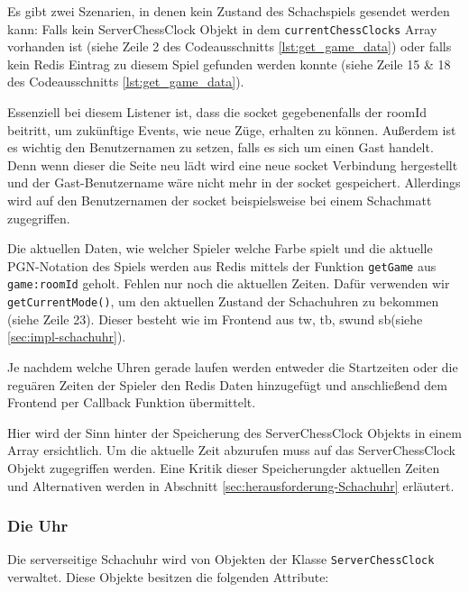 Es gibt zwei Szenarien, in denen kein Zustand des Schachspiels gesendet werden kann: Falls kein ServerChessClock Objekt in dem \verb|currentChessClocks| Array vorhanden ist (siehe Zeile 2 des Codeausschnitts \ref{lst:get_game_data}) oder falls kein Redis Eintrag zu diesem Spiel gefunden werden konnte (siehe Zeile 15 \& 18 des Codeausschnitts \ref{lst:get_game_data}).

Essenziell bei diesem Listener ist, dass die socket gegebenenfalls der roomId beitritt, um zukünftige Events, wie neue Züge, erhalten zu können. Außerdem ist es wichtig den Benutzernamen zu setzen, falls es sich um einen Gast handelt. Denn wenn dieser die Seite neu lädt wird eine neue socket Verbindung hergestellt und der Gast-Benutzername wäre nicht mehr in der socket gespeichert. Allerdings wird auf den Benutzernamen der socket beispielsweise bei einem Schachmatt zugegriffen.

Die aktuellen Daten, wie welcher Spieler welche Farbe spielt und die aktuelle PGN-Notation des Spiels werden aus Redis mittels der Funktion \verb|getGame| aus \verb|game:roomId| geholt. Fehlen nur noch die aktuellen Zeiten. Dafür verwenden wir \verb|getCurrentMode()|, um den aktuellen Zustand der Schachuhren zu bekommen (siehe Zeile 23). Dieser besteht wie im Frontend aus \glqq tw\grqq , \glqq tb\grqq , \glqq sw\grqq{ }und \glqq sb\grqq{ }(siehe \ref{sec:impl-schachuhr}). 

Je nachdem welche Uhren gerade laufen werden entweder die Startzeiten oder die reguären Zeiten der Spieler den Redis Daten hinzugefügt und anschließend dem Frontend per Callback Funktion übermittelt.

Hier wird der Sinn hinter der Speicherung des ServerChessClock Objekts in einem Array ersichtlich. Um die aktuelle Zeit abzurufen muss auf das ServerChessClock Objekt zugegriffen werden. Eine Kritik dieser Speicherungder aktuellen Zeiten und Alternativen werden in Abschnitt \ref{sec:herausforderung-Schachuhr} erläutert.

\subsubsection{Die Uhr}
\label{sec:Uhr-Backend-impl}
Die serverseitige Schachuhr wird von Objekten der Klasse \verb|ServerChessClock| verwaltet. Diese Objekte besitzen die folgenden Attribute:

